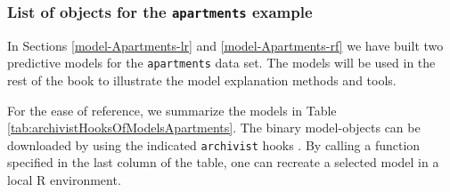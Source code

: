 \documentclass[12pt,]{krantz}
\begin{document}
\hypertarget{ListOfModelsApartments}{%
\subsubsection{\texorpdfstring{List of objects for the \texttt{apartments} example}{List of objects for the apartments example}}\label{ListOfModelsApartments}}

In Sections \ref{model-Apartments-lr} and \ref{model-Apartments-rf} we have built two predictive models for the \texttt{apartments} data set. The models will be used in the rest of the book to illustrate the model explanation methods and tools.

For the ease of reference, we summarize the models in Table \ref{tab:archivistHooksOfModelsApartments}. The binary model-objects can be downloaded by using the indicated \texttt{archivist} hooks \citep{archivist}. By calling a function specified in the last column of the table, one can recreate a selected model in a local R environment.
\end{document}
